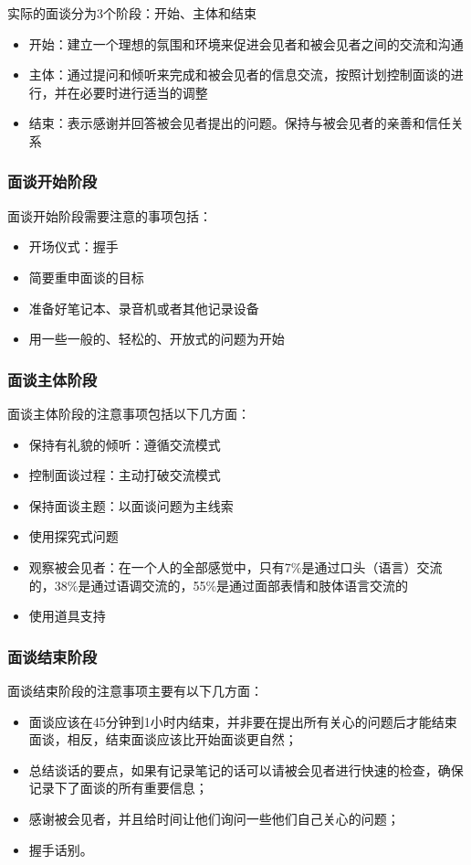 实际的面谈分为3个阶段：开始、主体和结束
\begin{itemize}
    \item 开始：建立一个理想的氛围和环境来促进会见者和被会见者之间的交流和沟通 
    \item 主体：通过提问和倾听来完成和被会见者的信息交流，按照计划控制面谈的进行，并在必要时进行适当的调整 
    \item 结束：表示感谢并回答被会见者提出的问题。保持与被会见者的亲善和信任关系 
\end{itemize}

\subsubsection{面谈开始阶段}
面谈开始阶段需要注意的事项包括：
\vspace{-0.8em}
\begin{multicols}{2}
    \begin{itemize}
        \item 开场仪式：握手
        \item 简要重申面谈的目标
        \item 准备好笔记本、录音机或者其他记录设备
        \item 用一些一般的、轻松的、开放式的问题为开始
    \end{itemize}
\end{multicols}
\vspace{-1em}

\subsubsection{面谈主体阶段}
面谈主体阶段的注意事项包括以下几方面：
\begin{itemize}
    \item 保持有礼貌的倾听：遵循交流模式
    \item 控制面谈过程：主动打破交流模式
    \item 保持面谈主题：以面谈问题为主线索
    \item 使用探究式问题 
    \item 观察被会见者：在一个人的全部感觉中，只有7\%是通过口头（语言）交流的，38\%是通过语调交流的，55\%是通过面部表情和肢体语言交流的
    \item 使用道具支持
\end{itemize}

\subsubsection{面谈结束阶段}
面谈结束阶段的注意事项主要有以下几方面：
\begin{itemize}
    \item 面谈应该在45分钟到1小时内结束，并非要在提出所有关心的问题后才能结束面谈，相反，结束面谈应该比开始面谈更自然；
    \item 总结谈话的要点，如果有记录笔记的话可以请被会见者进行快速的检查，确保记录下了面谈的所有重要信息；
    \item 感谢被会见者，并且给时间让他们询问一些他们自己关心的问题；
    \item 握手话别。 
\end{itemize}

